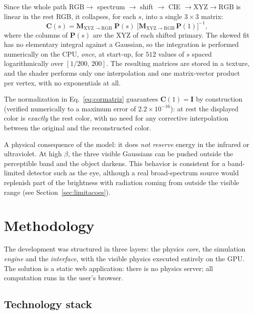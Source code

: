 \documentclass[10pt,a4paper,twocolumn]{article}
\begin{document}
Since the whole path $\mathrm{RGB} \to$ spectrum $\to$ shift $\to$ CIE $\to
\mathrm{XYZ} \to \mathrm{RGB}$ is linear in the rest RGB, it collapses, for each $s$, into
a single $3\times3$ matrix:
\begin{equation}
  \mathbf{C}(s) = \mathbf{M}_{\mathrm{XYZ}\to\mathrm{RGB}}\;\mathbf{P}(s)\;
                  \bigl[\mathbf{M}_{\mathrm{XYZ}\to\mathrm{RGB}}\,\mathbf{P}(1)\bigr]^{-1},
  \label{eq:cormatriz}
\end{equation}
where the columns of $\mathbf{P}(s)$ are the XYZ of each shifted primary. The skewed fit
has no elementary integral against a Gaussian, so the integration is performed numerically
on the CPU, \emph{once}, at start-up, for $512$ values of $s$ spaced logarithmically over
$[1/200,\,200]$. The resulting matrices are stored in a texture, and the shader performs
only one interpolation and one matrix-vector product per vertex, with no exponentials at
all.

The normalization in Eq.~\eqref{eq:cormatriz} guarantees $\mathbf{C}(1) = \mathbf{I}$ by
construction (verified numerically to a maximum error of $2.2\times10^{-16}$): at rest the
displayed color is \emph{exactly} the rest color, with no need for any corrective
interpolation between the original and the reconstructed color.

A physical consequence of the model: it does \emph{not reserve} energy in the infrared or
ultraviolet. At high $\beta$, the three visible Gaussians can be pushed outside the
perceptible band and the object darkens. This behavior is consistent for a band-limited
detector such as the eye, although a real broad-spectrum source would replenish part of
the brightness with radiation coming from outside the visible range (see
Section~\ref{sec:limitacoes}).

\section{Methodology}

The development was structured in three layers: the physics \emph{core}, the simulation
\emph{engine} and the \emph{interface}, with the visible physics executed entirely on the
GPU. The solution is a static web application: there is no physics server; all
computation runs in the user's browser.

\subsection{Technology stack}
\end{document}
